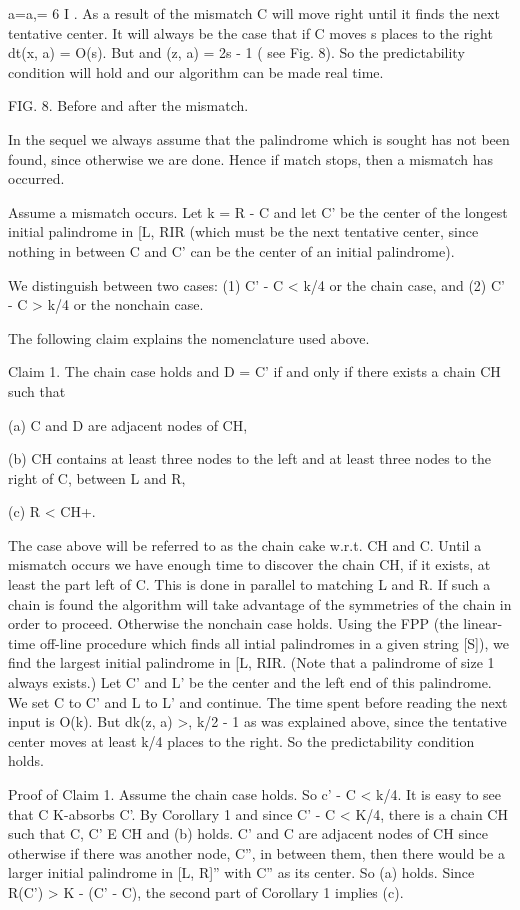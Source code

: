 \documentclass[11pt,a4paper]{report}
\begin{document}
a=a,= 6 I . As a result of the mismatch C will move right until it finds the next
tentative center. It will always be the case that if C moves s places to the right dt(x, a) =
O(s). But  and (z, a) = 2s - 1 ( see Fig. 8). So the predictability condition will hold and
our algorithm can be made real time.

FIG. 8. Before and after the mismatch.

In the sequel we always assume that the palindrome which is sought has not been
found, since otherwise we are done. Hence if match stops, then a mismatch has occurred.

Assume a mismatch occurs. Let k = R - C and let C’ be the center of the longest
initial palindrome in [L, RIR (which must be the next tentative center, since nothing in
between C and C’ can be the center of an initial palindrome).

We distinguish between two cases: (1) C’ - C < k/4 or the chain case, and (2)
C’ - C > k/4 or the nonchain case.

The following claim explains the nomenclature used above.

Claim 1. The chain case holds and D = C’ if and only if there exists a chain CH
such that

(a) C and D are adjacent nodes of CH,

(b) CH contains at least three nodes to the left and at least three nodes to the
right of C, between L and R,

(c) R < CH+.

The case above will be referred to as the chain cake w.r.t. CH and C. Until a mismatch
occurs we have enough time to discover the chain CH, if it exists, at least the part left
of C. This is done in parallel to matching L and R. If such a chain is found the algorithm
will take advantage of the symmetries of the chain in order to proceed. Otherwise the
nonchain case holds. Using the FPP (the linear-time off-line procedure which finds
all intial palindromes in a given string [S]), we find the largest initial palindrome in [L, RIR.
(Note that a palindrome of size 1 always exists.) Let C’ and L’ be the center and the left
end of this palindrome. We set C to C’ and L to L’ and continue. The time spent before
reading the next input is O(k). But dk(z, a) >, k/2 - 1 as was explained above, since
the tentative center moves at least k/4 places to the right. So the predictability condition
holds. 

Proof of Claim 1. Assume the chain case holds. So c’ - C < k/4. It is easy to see
that C K-absorbs C’. By Corollary 1 and since C’ - C < K/4, there is a chain CH such
that C, C’ E CH and (b) holds. C’ and C are adjacent nodes of CH since otherwise if
there was another node, C”, in between them, then there would be a larger initial palindrome in [L, R]” with C” as its center. So (a) holds. Since R(C’) > K - (C’ - C), the
second part of Corollary 1 implies (c).
\end{document}
